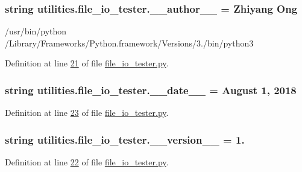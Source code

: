 \subsubsection[{\+\_\+\+\_\+author\+\_\+\+\_\+}]{\setlength{\rightskip}{0pt plus 5cm}string utilities.\+file\+\_\+io\+\_\+tester.\+\_\+\+\_\+author\+\_\+\+\_\+ = \textquotesingle{}Zhiyang Ong\textquotesingle{}}\label{namespaceutilities_1_1file__io__tester_a1e98e62ebd56ece4ec2a1b305f33aa72}


/usr/bin/python /\+Library/\+Frameworks/\+Python.framework/\+Versions/3./bin/python3 



Definition at line \hyperlink{file__io__tester_8py_source_l00021}{21} of file \hyperlink{file__io__tester_8py_source}{file\+\_\+io\+\_\+tester.\+py}.

\hypertarget{namespaceutilities_1_1file__io__tester_aff68b27f06e5ed552222d5e8ef71af1b}{}
\subsubsection[{\+\_\+\+\_\+date\+\_\+\+\_\+}]{\setlength{\rightskip}{0pt plus 5cm}string utilities.\+file\+\_\+io\+\_\+tester.\+\_\+\+\_\+date\+\_\+\+\_\+ = \textquotesingle{}August 1, 2018\textquotesingle{}}\label{namespaceutilities_1_1file__io__tester_aff68b27f06e5ed552222d5e8ef71af1b}


Definition at line \hyperlink{file__io__tester_8py_source_l00023}{23} of file \hyperlink{file__io__tester_8py_source}{file\+\_\+io\+\_\+tester.\+py}.

\hypertarget{namespaceutilities_1_1file__io__tester_a18133e21b0a493dfcb0dcd31bd81a40e}{}
\subsubsection[{\+\_\+\+\_\+version\+\_\+\+\_\+}]{\setlength{\rightskip}{0pt plus 5cm}string utilities.\+file\+\_\+io\+\_\+tester.\+\_\+\+\_\+version\+\_\+\+\_\+ = \textquotesingle{}1.\textquotesingle{}}\label{namespaceutilities_1_1file__io__tester_a18133e21b0a493dfcb0dcd31bd81a40e}


Definition at line \hyperlink{file__io__tester_8py_source_l00022}{22} of file \hyperlink{file__io__tester_8py_source}{file\+\_\+io\+\_\+tester.\+py}.

